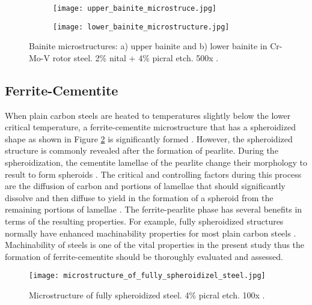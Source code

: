 \begin{figure}[H]

\centering
\begin{subfigure}{.45\textwidth}
    \centering
    \texttt{[image: upper\_bainite\_microstruce.jpg]}
    \caption{}
\end{subfigure}
\begin{subfigure}{.45\textwidth}
    \centering
    \texttt{[image: lower\_bainite\_microstructure.jpg]}
    \caption{}
\end{subfigure}

\caption{Bainite microstructures: a) upper bainite and b) lower bainite in Cr-Mo-V rotor steel. 2\% nital + 4\% picral etch. 500x \cite{molabe2018determining}.}
\label{ch3:figure:bainite:microstructures}
\end{figure}

\subsection{Ferrite-Cementite}
When plain carbon steels are heated to temperatures slightly below the lower critical temperature, a ferrite-cementite microstructure that has a spheroidized shape as shown in Figure \ref{ch3:figure:spheroidized_steel} is significantly formed \cite{molabe2018determining}. However, the spheroidized structure is commonly revealed after the formation of pearlite. During the spheroidization, the cementite lamellae of the pearlite change their morphology to result to form spheroids \cite{molabe2018determining}.
The critical and controlling factors during this process are the diffusion of carbon and portions of lamellae that should significantly dissolve and then diffuse to yield in the formation of a spheroid from the remaining portions of lamellae \cite{molabe2018determining}. The ferrite-pearlite phase has several benefits in terms of the resulting properties. For example, fully spheroidized structures normally have enhanced machinability properties for most plain carbon steels \cite{molabe2018determining}.  Machinability of steels is one of the vital properties in the present study thus the formation of ferrite-cementite should be thoroughly evaluated and assessed.

\begin{figure}[H]
    \centering
    \texttt{[image: microstructure\_of\_fully\_spheroidizel\_steel.jpg]}
    \caption{Microstructure of fully spheroidized steel. 4\% picral etch. 100x \cite{molabe2018determining}.}
    \label{ch3:figure:spheroidized_steel}
\end{figure}

